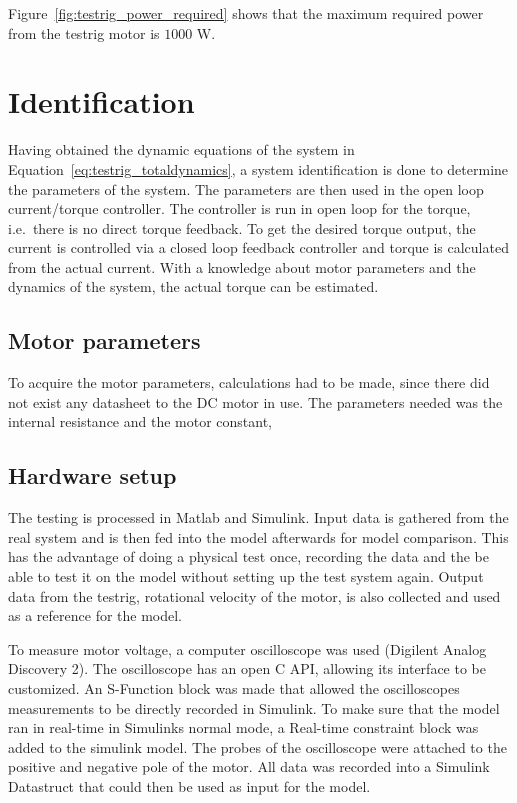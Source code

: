 Figure~\ref{fig:testrig_power_required} shows that the maximum required power
from the testrig motor is $1000$ W.

\section{Identification}
Having obtained the dynamic equations of the system in
Equation~\ref{eq:testrig_totaldynamics}, a system identification is done to
determine the parameters of the system. The parameters are then used in the
open loop current/torque controller. The controller is run in open loop for the
torque, i.e.\ there is no direct torque feedback. To get the desired torque
output, the current is controlled via a closed loop feedback controller and
torque is calculated from the actual current. With a knowledge about motor
parameters and the dynamics of the system, the actual torque can be estimated. 

\subsection{Motor parameters}
To acquire the motor parameters, calculations had to be made, since there did not exist any datasheet to the DC motor in use. The parameters needed was the internal resistance and the motor constant, 

\subsection{Hardware setup}
The testing is processed in Matlab and Simulink. Input data is gathered from the
real system and is then fed into the model afterwards for model comparison. This
has the advantage of doing a physical test once, recording the data and the be
able to test it on the model without setting up the test system again. Output
data from the testrig, rotational velocity of the motor, is also collected and
used as a reference for the model.

To measure motor voltage, a computer oscilloscope was used (Digilent Analog
Discovery 2). The oscilloscope has an open C API, allowing its interface to be
customized. An S-Function block was made that allowed the oscilloscopes
measurements to be directly recorded in Simulink. To make sure that the model
ran in real-time in Simulinks normal mode, a Real-time constraint block was
added to the simulink model. The probes of the oscilloscope were attached to
the positive and negative pole of the motor. All data was recorded into a
Simulink Datastruct that could then be used as input for the model. 

